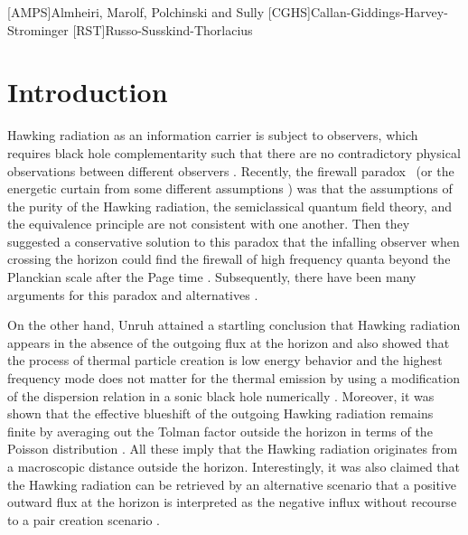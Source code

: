\documentclass[aps,a4paper,showpacs,showkeys,superscriptaddress,12pt]{revtex4-1}
\begin{document}

[AMPS]{Almheiri, Marolf, Polchinski and Sully}
[CGHS]{Callan-Giddings-Harvey-Strominger}
[RST]{Russo-Susskind-Thorlacius}

\section{Introduction}
\label{sec:intro}
Hawking radiation as an information carrier \cite{Hawking:1974sw} is subject to observers,
which requires black hole complementarity such that
there are no contradictory physical observations between different observers
\cite{Susskind:1993if}.
Recently, the firewall paradox~\cite{Almheiri:2012rt} (or
the energetic curtain from some different assumptions
\cite{Braunstein:2009my})
was that the assumptions of the purity of the Hawking radiation, the semiclassical quantum field theory,
and the equivalence principle are not consistent with one another.
Then they suggested a conservative solution to this paradox that the infalling observer when crossing the horizon
could find the firewall of high frequency quanta beyond the Planckian scale
after the Page time \cite{Page:1993wv}.
Subsequently, there have been many
arguments for this paradox and alternatives \cite{Bousso:2012as, Nomura:2012sw, Susskind:2012rm, Hossenfelder:2012mr, Giddings:2013kcj,
 Almheiri:2013hfa, Hutchinson:2013kka, Freivogel:2014dca}.

On the other hand, Unruh
attained a startling conclusion that Hawking radiation
appears in the absence of the outgoing flux at the horizon
\cite{Unruh:1976db} and also
showed that the process of thermal particle creation is low energy behavior
and the highest frequency mode does not matter for the thermal emission by
using a modification of the dispersion relation in a sonic black hole numerically \cite{Unruh:1994zw}.
Moreover, it was shown that the
effective blueshift of the outgoing Hawking radiation
remains finite
by averaging out the Tolman factor outside the horizon in terms of the Poisson distribution
\cite{Casadio:2002dj}.
All these imply that the Hawking radiation originates from a macroscopic distance
outside the horizon.
Interestingly, it was also claimed that the Hawking radiation can be retrieved by an alternative scenario
that a positive outward flux at the horizon is interpreted as the negative influx
without recourse to a pair creation scenario \cite{Israel:2015ava}.
\end{document}
